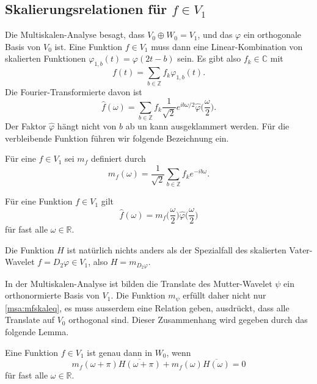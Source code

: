 \subsection{Skalierungsrelationen für $f\in V_1$}
Die Multiskalen-Analyse besagt, dass $V_0 \oplus W_0 = V_1$, und das
$\varphi$ ein orthogonale Basis von $V_0$ ist.
Eine Funktion $f\in V_1$ muss dann eine Linear-Kombination von
skalierten Funktionen $\varphi_{1,b}(t)=\varphi(2t-b)$ sein.
Es gibt also $f_k\in\mathbb C$ mit
\[
f(t) = \sum_{b\in\mathbb Z} f_k \varphi_{1,b}(t).
\]
Die Fourier-Transformierte davon ist
\[
\hat{f}(\omega)
=
\sum_{b\in\mathbb Z}
f_k
\frac{1}{\sqrt{2}}
e^{ib\omega/2}
\hat{\varphi}
\biggl(\frac{\omega}2\biggr).
\]
Der Faktor $\hat{\varphi}$ hängt nicht von $b$ ab un kann ausgeklammert
werden.
Für die verbleibende Funktion führen wir folgende Bezeichnung ein.

\begin{definition}
Für eine $f\in V_1$ sei $m_f$ definiert durch
\[
m_f(\omega)
=
\frac{1}{\sqrt{2}} \sum_{b\in\mathbb Z} f_k e^{-ib\omega}.
\]
\end{definition}

\begin{lemma}
\label{msa:mfskal}
Für eine Funktion $f\in V_1$ gilt
\begin{equation}
\hat{f}(\omega)
=
m_f\biggl(\frac{\omega}2\biggr)
\hat{\varphi}\biggl(\frac{\omega}2\biggr)
\label{msa:mfskaleq}
\end{equation}
für fast alle $\omega\in\mathbb R$.
\end{lemma}

Die Funktion $H$ ist natürlich nichts anders als der Spezialfall
des skalierten Vater-Wavelet $f=D_2\varphi\in V_1$, also $H=m_{D_2\varphi}$.

In der Multiskalen-Analyse ist bilden die Translate des Mutter-Wavelet $\psi$
ein orthonormierte Basis von $V_1$.
Die Funktion $m_{\psi}$ erfüllt daher nicht nur \eqref{msa:mfskaleq},
es muss ausserdem eine Relation geben, ausdrückt, dass alle Translate auf
$V_0$ orthogonal sind.
Dieser Zusammenhang wird gegeben durch das folgende Lemma.

\begin{lemma}
Eine Funktion $f\in V_1$ ist genau dann in $W_0$, wenn 
\[
m_f(\omega + \pi)\overline{H(\omega + \pi)}
+
m_f(\omega)\overline{H(\omega)}
=
0
\]
für fast alle $\omega\in\mathbb R$.
\end{lemma}

